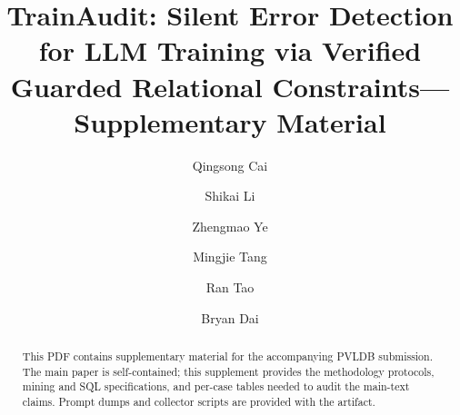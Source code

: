 \documentclass[sigconf,nonacm]{acmart}
\begin{document}
\title[TrainAudit: Supplementary Material]{TrainAudit: Silent Error Detection for LLM Training via Verified Guarded Relational Constraints---Supplementary Material}

\author{Qingsong Cai}

\author{Shikai Li}
\authornotemark[1]

\author{Zhengmao Ye}

\author{Mingjie Tang}

\author{Ran Tao}

\author{Bryan Dai}

\begin{abstract}
This PDF contains supplementary material for the accompanying PVLDB
submission. The main paper is self-contained; this supplement provides the
methodology protocols, mining and SQL specifications, and per-case tables
needed to audit the main-text claims. Prompt dumps and collector scripts are
provided with the artifact.
\end{abstract}

\maketitle

\appendix
\onecolumn
{}
\raggedbottom
\setlength{\floatsep}{6pt plus 2pt minus 2pt}
\setlength{\textfloatsep}{8pt plus 2pt minus 2pt}
\setlength{\intextsep}{6pt plus 2pt minus 2pt}
\setlength{\abovecaptionskip}{4pt}
\setlength{\belowcaptionskip}{0pt}
\renewcommand{\topfraction}{0.95}
\renewcommand{\bottomfraction}{0.95}
\renewcommand{\textfraction}{0.05}
\renewcommand{\floatpagefraction}{0.85}
\setcounter{topnumber}{4}
\setcounter{bottomnumber}{4}
\setcounter{totalnumber}{8}
\end{document}

